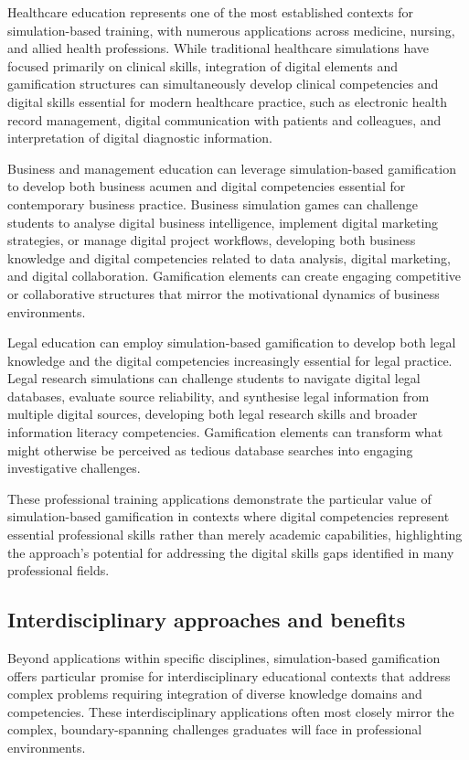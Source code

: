 \documentclass[cte]{acnsart}
\begin{document}
Healthcare education represents one of the most established contexts for simulation-based training, with numerous applications across medicine, nursing, and allied health professions. While traditional healthcare simulations have focused primarily on clinical skills, integration of digital elements and gamification structures can simultaneously develop clinical competencies and digital skills essential for modern healthcare practice, such as electronic health record management, digital communication with patients and colleagues, and interpretation of digital diagnostic information.

Business and management education can leverage simulation-based gamification to develop both business acumen and digital competencies essential for contemporary business practice. Business simulation games can challenge students to analyse digital business intelligence, implement digital marketing strategies, or manage digital project workflows, developing both business knowledge and digital competencies related to data analysis, digital marketing, and digital collaboration. Gamification elements can create engaging competitive or collaborative structures that mirror the motivational dynamics of business environments.

Legal education can employ simulation-based gamification to develop both legal knowledge and the digital competencies increasingly essential for legal practice. Legal research simulations can challenge students to navigate digital legal databases, evaluate source reliability, and synthesise legal information from multiple digital sources, developing both legal research skills and broader information literacy competencies. Gamification elements can transform what might otherwise be perceived as tedious database searches into engaging investigative challenges.

These professional training applications demonstrate the particular value of simulation-based gamification in contexts where digital competencies represent essential professional skills rather than merely academic capabilities, highlighting the approach's potential for addressing the digital skills gaps identified in many professional fields.

\subsection{Interdisciplinary approaches and benefits}

Beyond applications within specific disciplines, simulation-based gamification offers particular promise for interdisciplinary educational contexts that address complex problems requiring integration of diverse knowledge domains and competencies. These interdisciplinary applications often most closely mirror the complex, boundary-spanning challenges graduates will face in professional environments.
\end{document}
